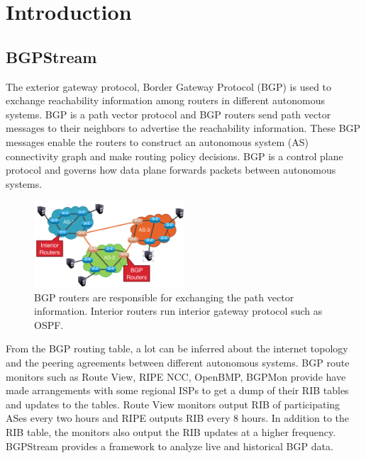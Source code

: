  \section{Introduction}\label{sec:introduction}
  \subsection{BGPStream}
 The exterior gateway protocol, Border Gateway Protocol (BGP) is used to exchange reachability information among routers in different autonomous systems. BGP is a path vector protocol and BGP routers send path vector messages to their neighbors to advertise the reachability information. These BGP messages enable the routers to construct an autonomous system (AS) connectivity graph and make routing policy decisions. BGP is a control plane protocol and governs how data plane forwards packets between autonomous systems. 
 \begin{figure}[!htbp]
	\includegraphics[width=0.5\textwidth]{Interior_and_BGP_routers.png}
	\caption{BGP routers are responsible for exchanging the path vector information. Interior routers run interior gateway protocol such as OSPF.}
	\label{a:label}
\end{figure}
From the BGP routing table, a lot can be inferred about the internet topology and the peering agreements between different autonomous systems. BGP route monitors such as Route View, RIPE NCC, OpenBMP, BGPMon provide have made arrangements with some regional ISPs to get a dump of their RIB tables and updates to the tables. Route View monitors output RIB of participating ASes every two hours and RIPE outputs RIB every 8 hours\cite{orsini_bgpstream:_2016}. In addition to the RIB table, the monitors also output the RIB updates at a higher frequency.  BGPStream provides a framework to analyze live and historical BGP data.  
